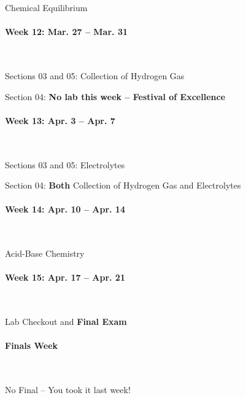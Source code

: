 \documentclass[12pt, letterpaper]{article}
\begin{document}
Chemical Equilibrium

\paragraph{Week 12: Mar. 27 -- Mar. 31}~

Sections 03 and 05: Collection of Hydrogen Gas

Section 04: \textbf{No lab this week -- Festival of Excellence}

\paragraph{Week 13: Apr. 3 -- Apr. 7}~

Sections 03 and 05: Electrolytes

Section 04: \textbf{Both} Collection of Hydrogen Gas and Electrolytes

\paragraph{Week 14: Apr. 10 -- Apr. 14}~

Acid-Base Chemistry

\paragraph{Week 15: Apr. 17 -- Apr. 21}~

Lab Checkout and \textbf{Final Exam}

\paragraph{Finals Week}~

No Final -- You took it last week!
\end{document}
